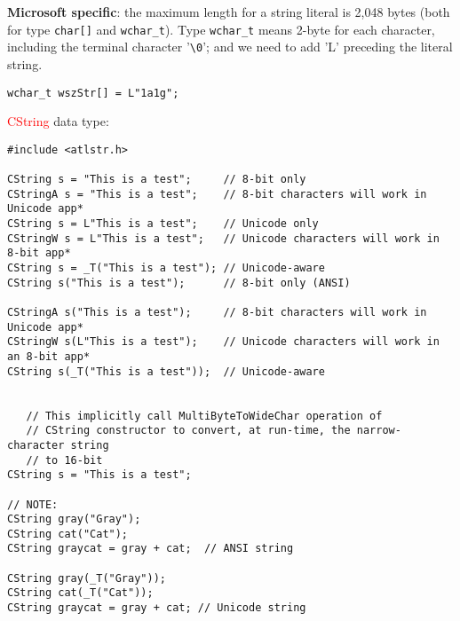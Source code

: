\begin{mdframed}
{\bf Microsoft specific}: the maximum length for a string literal is 2,048
bytes (both for type \verb!char[]! and \verb!wchar_t!). Type \verb!wchar_t! means 2-byte for
each character, including the terminal character '\verb!\0!'; and we need to add
'L' preceding the literal string.
\begin{verbatim}
wchar_t wszStr[] = L"1a1g";
\end{verbatim}
\end{mdframed}


\textcolor{red}{CString} data type:
\begin{verbatim}
#include <atlstr.h>

CString s = "This is a test";     // 8-bit only
CStringA s = "This is a test";    // 8-bit characters will work in Unicode app*
CString s = L"This is a test";    // Unicode only
CStringW s = L"This is a test";   // Unicode characters will work in 8-bit app*
CString s = _T("This is a test"); // Unicode-aware
CString s("This is a test");      // 8-bit only (ANSI)

CStringA s("This is a test");     // 8-bit characters will work in Unicode app*
CStringW s(L"This is a test");    // Unicode characters will work in an 8-bit app*
CString s(_T("This is a test"));  // Unicode-aware


   // This implicitly call MultiByteToWideChar operation of
   // CString constructor to convert, at run-time, the narrow-character string
   // to 16-bit 
CString s = "This is a test"; 

// NOTE:
CString gray("Gray");
CString cat("Cat");
CString graycat = gray + cat;  // ANSI string

CString gray(_T("Gray"));
CString cat(_T("Cat"));
CString graycat = gray + cat; // Unicode string
\end{verbatim}




% 



